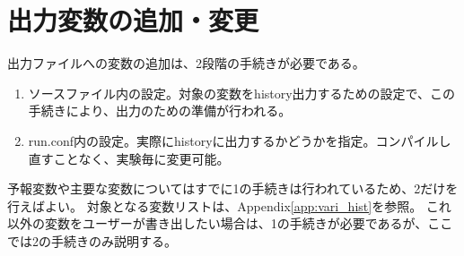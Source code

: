 \section{出力変数の追加・変更}
出力ファイルへの変数の追加は、2段階の手続きが必要である。
\begin{enumerate}
\item ソースファイル内の設定。対象の変数をhistory出力するための設定で、この手続きにより、出力のための準備が行われる。
\item run.conf内の設定。実際にhistoryに出力するかどうかを指定。コンパイルし直すことなく、実験毎に変更可能。
\end{enumerate}
予報変数や主要な変数についてはすでに1の手続きは行われているため、2だけを行えばよい。
対象となる変数リストは、Appendix\ref{app:vari_hist}を参照。
これ以外の変数をユーザーが書き出したい場合は、1の手続きが必要であるが、ここでは2の手続きのみ説明する。


